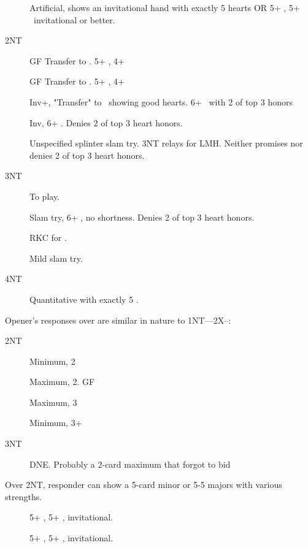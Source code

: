 \documentclass[tom-ari]{subfiles}
\begin{document}
\begin{description}
  \item[] Artificial, shows an invitational hand with exactly 5 hearts OR 5+ \heartsuit, 5+ \spadesuit ~invitational or better.
  \item[2NT] GF Transfer to \clubsuit. 5+ \heartsuit, 4+ \clubsuit
  \item[] GF Transfer to \diamondsuit. 5+ \heartsuit, 4+ \diamondsuit
  \item[] Inv+, "Transfer" to \heartsuit ~showing good hearts. 6+ \heartsuit ~with 2 of top 3 honors
  \item[] Inv, 6+ \heartsuit. Denies 2 of top 3 heart honors.
  \item[] Unspecified splinter slam try. 3NT relays for LMH. Neither promises nor denies 2 of top 3 heart honors.
  \item[3NT] To play.
  \item[] Slam try, 6+ \heartsuit, no shortness. Denies 2 of top 3 heart honors.
  \item[] RKC for \heartsuit.
  \item[] Mild slam try. 
  \item[4NT] Quantitative with exactly 5 \heartsuit.
\end{description}

Opener's responses over  are similar in nature to 1NT----2X--:

\begin{description}
  \item[2NT] Minimum, 2\heartsuit
  \item[] Maximum, 2\heartsuit. GF
  \item[] Maximum, 3\heartsuit
  \item[] Minimum, 3+ \heartsuit
  \item[3NT] DNE. Probably a 2-card maximum that forgot to bid 
\end{description}

Over 2NT, responder can show a 5-card minor or 5-5 majors with various strengths.

\begin{description}
  \item[] 5+ \heartsuit, 5+ \clubsuit, invitational.
  \item[] 5+ \heartsuit, 5+ \diamondsuit, invitational.
\end{description}
\end{document}

